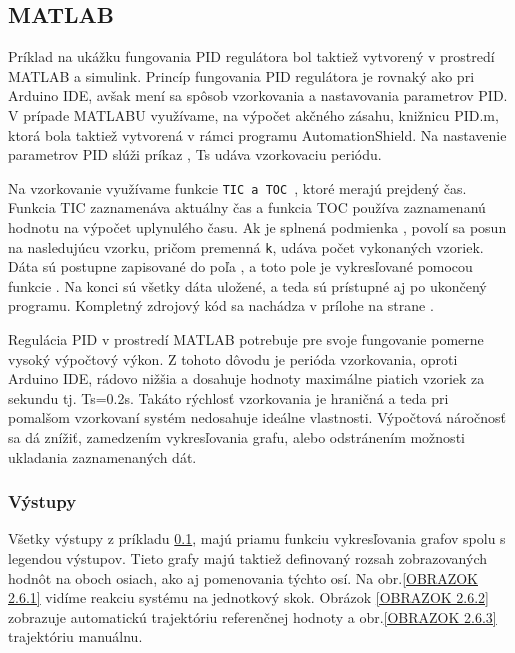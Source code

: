 \newpage
\subsection{MATLAB}
\label{MATLABPID}

Príklad na ukážku fungovania PID regulátora bol taktiež vytvorený v prostredí MATLAB a simulink. Princíp fungovania PID regulátora je rovnaký ako pri Arduino IDE, avšak mení sa spôsob vzorkovania a nastavovania parametrov PID. V prípade MATLABU využívame, na výpočet akčného zásahu, knižnicu PID.m, ktorá bola taktiež vytvorená v rámci programu AutomationShield. Na nastavenie parametrov PID slúži príkaz , Ts udáva vzorkovaciu periódu. 

Na vzorkovanie využívame funkcie \verb|TIC a TOC |, ktoré merajú prejdený čas. Funkcia TIC zaznamenáva aktuálny čas a funkcia TOC používa zaznamenanú hodnotu na výpočet uplynulého času. Ak je splnená podmienka , povolí sa posun na nasledujúcu vzorku, pričom premenná \verb*|k|, udáva počet vykonaných vzoriek. Dáta sú postupne zapisované do poľa , a toto pole je vykresľované pomocou funkcie . Na konci sú všetky dáta uložené, a teda sú prístupné aj po ukončený programu. Kompletný zdrojový kód sa nachádza v prílohe na strane \pageref{AeroShieldPID.m}.

Regulácia PID v prostredí MATLAB potrebuje pre svoje fungovanie pomerne vysoký výpočtový výkon. Z tohoto dôvodu je perióda vzorkovania, oproti Arduino IDE, rádovo nižšia a dosahuje hodnoty maximálne piatich vzoriek za sekundu tj. Ts=0.2s. Takáto rýchlosť vzorkovania je hraničná a teda pri pomalšom vzorkovaní systém nedosahuje ideálne vlastnosti. Výpočtová náročnosť sa dá znížiť, zamedzením vykresľovania grafu, alebo odstránením možnosti ukladania zaznamenaných dát. 


\subsubsection{Výstupy}

Všetky výstupy z príkladu \ref{MATLABPID}, majú priamu funkciu vykresľovania grafov spolu s legendou výstupov. Tieto grafy majú taktiež definovaný rozsah zobrazovaných hodnôt na oboch osiach, ako aj pomenovania týchto osí. Na obr.\ref{OBRAZOK 2.6.1} vidíme reakciu systému na jednotkový skok. Obrázok \ref{OBRAZOK 2.6.2} zobrazuje automatickú trajektóriu referenčnej hodnoty a obr.\ref{OBRAZOK 2.6.3} trajektóriu manuálnu. 


